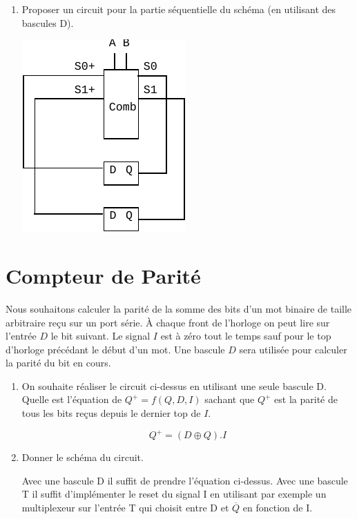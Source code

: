 \documentclass[a4paper,10pt]{exam}
\begin{document}
\begin{enumerate}
  \item Proposer un circuit pour la partie séquentielle du schéma (en utilisant
    des bascules D).
    \begin{solution}
      \includegraphics{TD9-auto2}
    \end{solution}

\end{enumerate}

\section{Compteur de Parité}
Nous souhaitons calculer la parité de la somme des bits d'un mot binaire de
taille arbitraire reçu sur un port série. À chaque front de l'horloge on peut
lire sur l'entrée $D$ le bit suivant. Le signal $I$ est à zéro tout le temps
sauf pour le top d'horloge précédant le début d'un mot. Une bascule $D$ sera
utilisée pour calculer la parité du bit en cours.

\begin{enumerate}
  \item On souhaite réaliser le circuit ci-dessus en utilisant une seule bascule
    D. Quelle est l'équation de $Q^{+} = f(Q,D,I)$ sachant que $Q^{+}$ est la
    parité de tous les bits reçus depuis le dernier top de $I$.

    \begin{solution}
      $$Q^+ = (D \oplus Q).I $$
    \end{solution}
  \item Donner le schéma du circuit.
    \begin{solution}
      Avec une bascule D il suffit de prendre l'équation ci-dessus.
      Avec une bascule T il suffit d'implémenter le reset du signal I en
      utilisant par exemple un multiplexeur sur l'entrée T qui choisit entre
      D et $\overline{Q}$ en fonction de I.
    \end{solution}
\end{enumerate}
\end{document}
